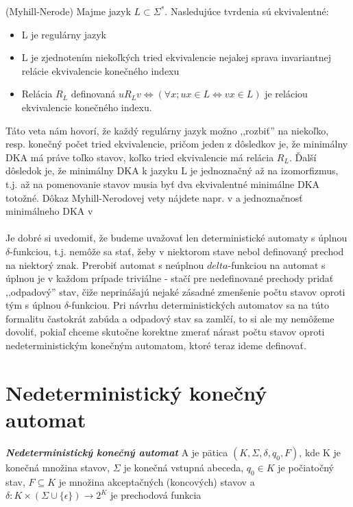 \newpage

\begin{thm}(Myhill-Nerode) Majme jazyk $L \subset \Sigma^*$. Nasledujúce tvrdenia sú ekvivalentné:
\begin{itemize}
  \item L je regulárny jazyk
  \item L je zjednotením niekoľkých tried ekvivalencie nejakej sprava invariantnej relácie ekvivalencie konečného indexu
  \item Relácia $R_L$ definovaná $uR_Lv \Longleftrightarrow (\forall x;ux \in L \Longleftrightarrow vx \in L)$ je reláciou ekvivalencie konečného indexu.
\end{itemize}
\end{thm}

Táto veta nám hovorí, že každý regulárny jazyk možno ,,rozbiť'' na niekoľko, resp. konečný počet tried ekvivalencie, pričom jeden z dôsledkov je, že minimálny DKA má práve toľko stavov, koľko tried ekvivalencie má relácia $R_L$. Ďalší dôsledok je, že minimálny DKA k jazyku L je jednoznačný až na izomorfizmus, t.j. až na pomenovanie stavov musia byť dva ekvivalentné minimálne DKA totožné. Dôkaz Myhill-Nerodovej vety nájdete napr. v \cite[Veta 2.9.1]{skripta} a jednoznačnosť minimálneho DKA v \cite[Veta 4.26]{hopcroft}

\paragraph{}
Je dobré si uvedomiť, že budeme uvažovať len deterministické automaty s úplnou $\delta$-funkciou, t.j. nemôže sa stať, žeby v niektorom stave nebol definovaný prechod na niektorý znak. Prerobiť automat s neúplnou $delta$-funkciou na automat s úplnou je v každom prípade triviálne - stačí pre nedefinované prechody pridať ,,odpadový'' stav, čiže neprinášajú nejaké zásadné zmenšenie počtu stavov oproti tým s úplnou $\delta$-funkciou. Pri návrhu deterministických automatov sa na túto formalitu častokrát zabúda a odpadový stav sa zamlčí, to si ale my nemôžeme dovoliť, pokiaľ chceme skutočne korektne zmerať nárast počtu stavov oproti nedeterministickým konečným automatom, ktoré teraz ideme definovať.

\section{Nedeterministický konečný automat}

\begin{defn}{\textbf {\textit {Nedeterministický konečný automat}}} A je pätica $(K,\Sigma,\delta,q_0,F)$, kde K je
konečná množina stavov, $\Sigma$ je konečná vstupná abeceda, $q_0 \in K$ je počiatočný stav, $F \subseteq K$ je množina akceptačných (koncových) stavov a $\delta: K \times (\Sigma \cup \{\epsilon\}) \rightarrow 2^{K}$ je prechodová funkcia \end{defn}


